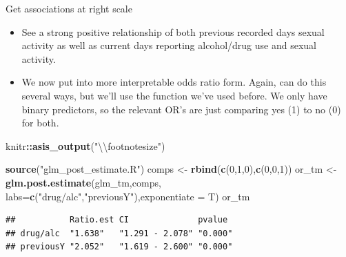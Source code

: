 \documentclass[ignorenonframetext,]{beamer}
\newenvironment{Shaded}{\begin{snugshade}}{\end{snugshade}}
\newcommand{\KeywordTok}[1]{\textcolor[rgb]{0.13,0.29,0.53}{\textbf{#1}}}
\newcommand{\DataTypeTok}[1]{\textcolor[rgb]{0.13,0.29,0.53}{#1}}
\newcommand{\DecValTok}[1]{\textcolor[rgb]{0.00,0.00,0.81}{#1}}
\newcommand{\CharTok}[1]{\textcolor[rgb]{0.31,0.60,0.02}{#1}}
\newcommand{\StringTok}[1]{\textcolor[rgb]{0.31,0.60,0.02}{#1}}
\newcommand{\OperatorTok}[1]{\textcolor[rgb]{0.81,0.36,0.00}{\textbf{#1}}}
\newcommand{\NormalTok}[1]{#1}
\providecommand{\tightlist}{%
  \setlength{\itemsep}{0pt}\setlength{\parskip}{0pt}}
\begin{document}
\begin{frame}[fragile]{Get associations at right scale}

\begin{itemize}
\tightlist
\item
  See a strong positive relationship of both previous recorded days
  sexual activity as well as current days reporting alcohol/drug use and
  sexual activity.
\item
  We now put into more interpretable odds ratio form. Again, can do this
  several ways, but we'll use the function we've used before. We only
  have binary predictors, so the relevant OR's are just comparing yes
  (1) to no (0) for both.
\end{itemize}

\begin{Shaded}
\begin{Highlighting}[]
\NormalTok{knitr}\OperatorTok{::}\KeywordTok{asis_output}\NormalTok{(}\StringTok{"}\CharTok{\textbackslash{}\textbackslash{}}\StringTok{footnotesize"}\NormalTok{)}
\end{Highlighting}
\end{Shaded}

\footnotesize

\begin{Shaded}
\begin{Highlighting}[]
\KeywordTok{source}\NormalTok{(}\StringTok{"glm_post_estimate.R"}\NormalTok{)}
\NormalTok{comps <-}\StringTok{ }\KeywordTok{rbind}\NormalTok{(}\KeywordTok{c}\NormalTok{(}\DecValTok{0}\NormalTok{,}\DecValTok{1}\NormalTok{,}\DecValTok{0}\NormalTok{),}\KeywordTok{c}\NormalTok{(}\DecValTok{0}\NormalTok{,}\DecValTok{0}\NormalTok{,}\DecValTok{1}\NormalTok{))}
\NormalTok{or_tm <-}\StringTok{ }\KeywordTok{glm.post.estimate}\NormalTok{(glm_tm,comps, }
  \DataTypeTok{labs=}\KeywordTok{c}\NormalTok{(}\StringTok{"drug/alc"}\NormalTok{,}\StringTok{"previousY"}\NormalTok{),}\DataTypeTok{exponentiate =}\NormalTok{ T)            }
\NormalTok{or_tm}
\end{Highlighting}
\end{Shaded}

\begin{verbatim}
##           Ratio.est CI              pvalue 
## drug/alc  "1.638"   "1.291 - 2.078" "0.000"
## previousY "2.052"   "1.619 - 2.600" "0.000"
\end{verbatim}

\end{frame}
\end{document}
